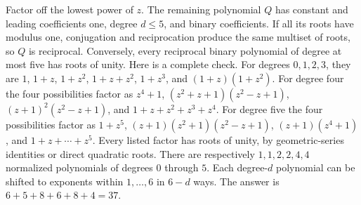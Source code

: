 Factor off the lowest power of $z$. The remaining polynomial $Q$ has constant and leading coefficients one, degree $d\le5$, and binary coefficients. If all its roots have modulus one, conjugation and reciprocation produce the same multiset of roots, so $Q$ is reciprocal. Conversely, every reciprocal binary polynomial of degree at most five has roots of unity. Here is a complete check. For degrees $0,1,2,3$, they are $1$, $1+z$, $1+z^2$, $1+z+z^2$, $1+z^3$, and $(1+z)(1+z^2)$. For degree four the four possibilities factor as $z^4+1$, $(z^2+z+1)(z^2-z+1)$, $(z+1)^2(z^2-z+1)$, and $1+z+z^2+z^3+z^4$. For degree five the four possibilities factor as $1+z^5$, $(z+1)(z^2+1)(z^2-z+1)$, $(z+1)(z^4+1)$, and $1+z+\cdots+z^5$. Every listed factor has roots of unity, by geometric-series identities or direct quadratic roots. There are respectively $1,1,2,2,4,4$ normalized polynomials of degrees $0$ through $5$. Each degree-$d$ polynomial can be shifted to exponents within $1,\ldots,6$ in $6-d$ ways. The answer is $6+5+8+6+8+4=\boxed{37}$.
